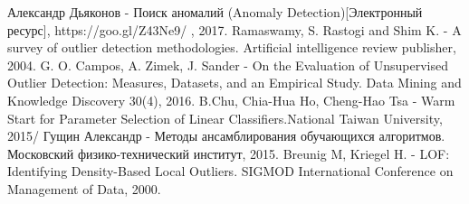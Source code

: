 \documentclass[a4paper, 12pt]{article}
\begin{document}
    
\begin{thebibliography}{00} %
  Александр Дьяконов -  Поиск аномалий (Anomaly Detection)[Электронный ресурс],
 https://goo.gl/Z43Ne9/ , 2017.
	Ramaswamy, S. Rastogi and Shim K. - A survey of outlier detection methodologies. Artificial intelligence review publisher, 2004.
 G. O. Campos, A. Zimek, J. Sander - On the Evaluation of Unsupervised Outlier Detection: Measures, Datasets, and an Empirical Study. Data Mining and Knowledge Discovery 30(4), 2016.
	B.Chu, Chia-Hua Ho, Cheng-Hao Tsa - Warm Start for Parameter Selection of Linear Classifiers.National Taiwan University, 2015/
	Гущин Александр - Методы ансамблирования
	обучающихся алгоритмов. Московский физико-технический институт, 2015.
	Breunig M, Kriegel H. - LOF: Identifying Density-Based Local Outliers. SIGMOD International Conference on Management of Data, 2000.
\end{thebibliography}
\end{document}

